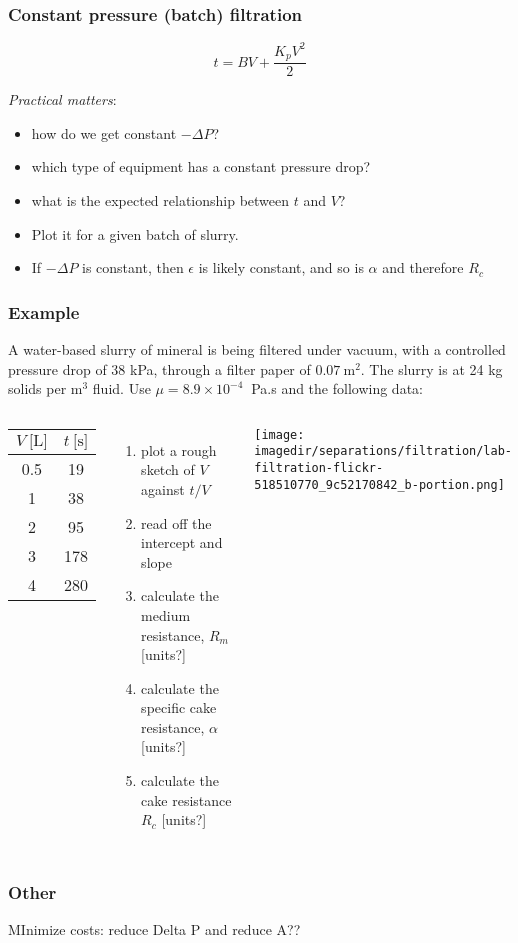 \begin{frame}\frametitle{Constant pressure (batch) filtration}
	\[ t = BV +  \dfrac{K_pV^2}{2} \]
	\vspace{12pt}

	\emph{Practical matters}:
	\begin{itemize}
		\item	how do we get constant $-\Delta P$?
		\item	which type of equipment has a constant pressure drop?
		\item	what is the expected relationship between $t$ and $V$?
		\item	Plot it for a given batch of slurry.
		\item	If $-\Delta P$ is constant, then $\epsilon$ is likely constant, and so is $\alpha$ and therefore $R_c$
	\end{itemize}
\end{frame}

\begin{frame}\frametitle{Example}
	A water-based slurry of mineral is being filtered under vacuum, with a controlled pressure drop of 38 kPa, through a filter paper of $0.07~\text{m}^2$. The slurry is at 24 kg solids per $\text{m}^3$ fluid. Use $\mu = 8.9 \times 10^{-4}~$ Pa.s and the following data:

	\begin{columns}[t]
			\vspace{-12pt}
			\begin{center}
				\begin{tabular}{c|c}
					$V~\text{[L]}$		&	$t~\text{[s]}$\\ \hline
					0.5				 	& 	19\\
					1					& 	38\\
					2					& 	95\\
					3					& 	178\\
					4					&	280\\ \hline
				\end{tabular}
			\end{center}
			\begin{enumerate}
				\item	plot a rough sketch of $V$ against $t/V$
				\item	read off the intercept and slope
				\item	calculate the medium resistance, $R_m$ [units?]
				\item	calculate the specific cake resistance, $\alpha$ [units?]
				\item	calculate the cake resistance $R_c$ [units?]
			\end{enumerate}
			\begin{center}
				\texttt{[image: \\imagedir/separations/filtration/lab-filtration-flickr-518510770\_9c52170842\_b-portion.png]}
			\end{center}
	\end{columns}
\end{frame}

\begin{frame}\frametitle{Other}
	MInimize costs: reduce Delta P and reduce A??
\end{frame}

